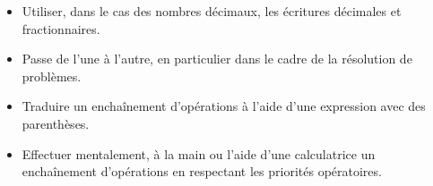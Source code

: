 \begin{prerequis}[Objectifs de 5\up{e}]    
    \begin{itemize}
        \item Utiliser, dans le cas des nombres décimaux, les écritures décimales et fractionnaires.
        \item Passe de l’une à l’autre, en particulier dans le cadre de la résolution de problèmes.
        \columnbreak
        \item Traduire un enchaînement d’opérations à l’aide d’une expression avec des parenthèses.
        \item Effectuer mentalement, à la main ou l’aide d’une calculatrice un enchaînement d’opérations en respectant les priorités opératoires. 
    \end{itemize}
\end{prerequis}
